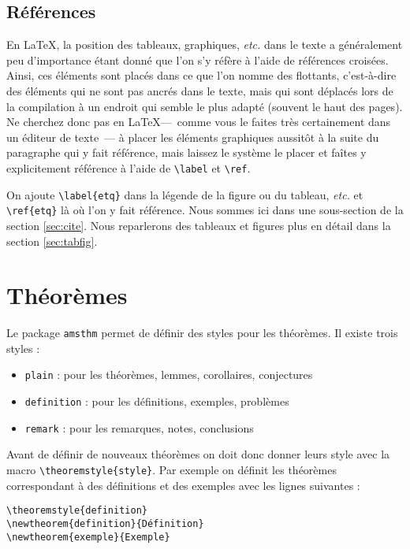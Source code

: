 \documentclass{rapport}
\def\Latex{\LaTeX\xspace}
\def\etc{\textit{etc.}\xspace}
\begin{document}
      \subsection{Références\label{sec:ref}}
        En \Latex, la position des tableaux, graphiques, \etc dans le texte a généralement peu d'importance étant donné que l'on s'y réfère à l'aide de références croisées. Ainsi, ces éléments sont placés dans ce que l'on nomme des flottants, c'est-à-dire des éléments qui ne sont pas ancrés dans le texte, mais qui sont déplacés lors de la compilation à un endroit qui semble le plus adapté (souvent le haut des pages). Ne cherchez donc pas en \Latex---~comme vous le faites très certainement dans un éditeur de texte~--- à placer les éléments graphiques aussitôt à la suite du paragraphe qui y fait référence, mais laissez le système le placer et faîtes y explicitement référence à l'aide de \verb|\label| et \verb|\ref|.
        
        On ajoute \verb|\label{etq}| dans la légende de la figure ou du tableau, \etc et \verb"\ref{etq}" là où l'on y fait référence. Nous sommes ici dans une sous-section de la section \ref{sec:cite}. Nous reparlerons des tableaux et figures plus en détail dans la section \ref{sec:tabfig}.
        
    \section{Théorèmes}
      
      Le package \verb!amsthm! permet de définir des styles pour les théorèmes. Il existe trois styles :
      
      \begin{itemize}
        \item \verb|plain| : pour les théorèmes, lemmes, corollaires, conjectures
        \item \verb|definition| : pour les définitions, exemples, problèmes
        \item \verb|remark| : pour les remarques, notes, conclusions
      \end{itemize}
      
      Avant de définir de nouveaux théorèmes on doit donc donner leurs style avec la macro \verb|\theoremstyle{style}|.
      Par exemple on définit les théorèmes correspondant à des définitions et des exemples avec les lignes suivantes : 
      
      \begin{verbatim}
\theoremstyle{definition}
\newtheorem{definition}{Définition}
\newtheorem{exemple}{Exemple}\end{verbatim}
      
\end{document}
